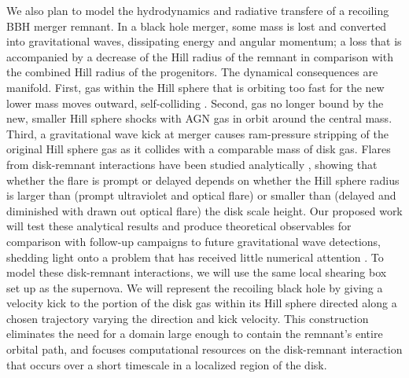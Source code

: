 We also plan to model the hydrodynamics and radiative transfere of a recoiling BBH merger remnant.
In a black hole merger, some mass is lost and converted into gravitational waves, dissipating energy and angular momentum; a loss that is accompanied by a decrease of the Hill radius of the remnant in comparison with the combined Hill radius of the progenitors.
The dynamical consequences are manifold.
First, gas within the Hill sphere that is orbiting too fast for the new lower mass moves outward, self-colliding \citep{McKernan+19}.
Second, gas no longer bound by the new, smaller Hill sphere shocks with AGN gas in orbit around the central mass.
Third, a gravitational wave kick at merger causes ram-pressure stripping of the original Hill sphere gas as it collides with a comparable mass of disk gas.
Flares from disk-remnant interactions have been studied analytically \citep{McKernan+19}, showing that whether the flare is prompt or delayed depends on whether the Hill sphere radius is larger than (prompt ultraviolet and optical flare) or smaller than (delayed and diminished with drawn out optical flare) the disk scale height.
Our proposed work will test these analytical results and produce theoretical observables for comparison with follow-up campaigns to future gravitational wave detections, shedding light onto a problem that has received little numerical attention \citep{Corrales+10}.
To model these disk-remnant interactions, we will use the same local shearing box set up as the
supernova.
We will represent the recoiling black hole by giving a velocity kick to the portion of
the disk gas within its Hill sphere directed along a chosen trajectory varying the direction and kick
velocity.
This construction eliminates the need for a domain large enough to contain the remnant’s
entire orbital path, and focuses computational resources on the disk-remnant interaction that occurs
over a short timescale in a localized region of the disk.
